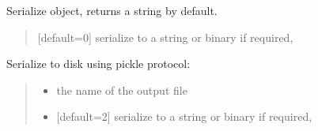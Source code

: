 \documentclass[letterpaper,12pt,english]{sphinxmanual}
\begin{document}
\begin{fulllineitems}
\begin{fulllineitems}
\begin{quote}
\begin{description}
\end{description}\end{quote}

\end{fulllineitems}


\begin{fulllineitems}
\label{\detokenize{api/core:cbmpy.CBModel.Model.serialize}}
\pysigstartsignatures
\pysiglinewithargsret
{}
{}
{}
\pysigstopsignatures
\sphinxAtStartPar
Serialize object, returns a string by default.
\begin{quote}\begin{description}
\sphinxAtStartPar
{} \textendash{} {[}default=0{]} serialize to a string or binary if required,

\end{description}\end{quote}

\end{fulllineitems}


\begin{fulllineitems}
\label{\detokenize{api/core:cbmpy.CBModel.Model.serializeToDisk}}
\pysigstartsignatures
\pysiglinewithargsret
{}
{\sphinxparamcomma {}}
{}
\pysigstopsignatures
\sphinxAtStartPar
Serialize to disk using pickle protocol:
\begin{quote}\begin{description}
\begin{itemize}
\item {} 
\sphinxAtStartPar
{} \textendash{} the name of the output file

\item {} 
\sphinxAtStartPar
{} \textendash{} {[}default=2{]} serialize to a string or binary if required,


\end{itemize}
\end{description}
\end{quote}
\end{fulllineitems}
\end{fulllineitems}
\end{document}
